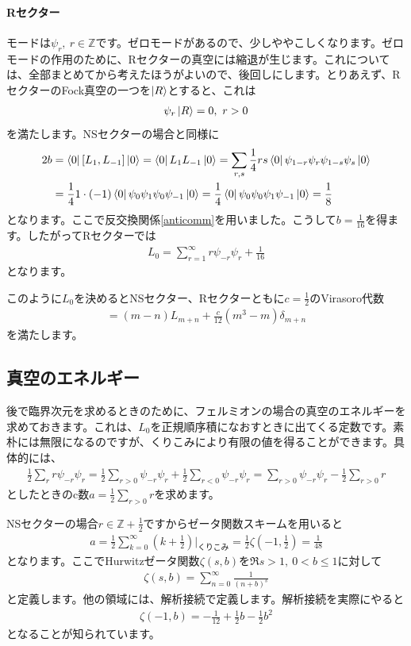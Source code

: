 \documentclass[report,paper=a4, fontsize=12pt, line_length=16cm, number_of_lines=33,dvipdfmx]{jlreq}
\numberwithin{equation}{chapter}
\numberwithin{equation}{section}
\newcommand{\Zb}{\mathbb{Z}}
\begin{document}
\paragraph{Rセクター}
モードは$\psi_{r},\ r\in \Zb$です。ゼロモードがあるので、少しややこしくなります。ゼロモードの作用のために、Rセクターの真空には縮退が生じます。これについては、全部まとめてから考えたほうがよいので、後回しにします。とりあえず、RセクターのFock真空の一つを$\ket{R}$とすると、これは
\begin{align}
  \psi_{r}\ket{R}=0,\ r>0
\end{align}
を満たします。NSセクターの場合と同様に
\begin{align}
  2b&=\bra{0}[L_{1},L_{-1}]\ket{0}
  =\bra{0}L_{1}L_{-1}\ket{0}
  =\sum_{r,s}\frac14rs\bra{0}\psi_{1-r}\psi_{r}\psi_{1-s}\psi_{s}\ket{0}\nonumber\\
  &
  =\frac14 1\cdot (-1)\bra{0}\psi_{0}\psi_{1}\psi_{0}\psi_{-1}\ket{0}
  =\frac14 \bra{0}\psi_{0}\psi_{0}\psi_{1}\psi_{-1}\ket{0}
  =\frac{1}{8}
\end{align}
となります。ここで反交換関係\eqref{anticomm}を用いました。こうして$b=\frac{1}{16}$を得ます。したがってRセクターでは
\begin{align}
  L_0=\sum_{r=1}^{\infty} r\psi_{-r}\psi_{r}
  +\frac{1}{16}
\end{align}
となります。

このように$L_0$を決めるとNSセクター、Rセクターともに$c=\frac12$のVirasoro代数
\begin{align}
  [L_m,L_n]=(m-n)L_{m+n}+\frac{c}{12}(m^3-m)\delta_{m+n}
\end{align}
を満たします。

\subsection{真空のエネルギー}
後で臨界次元を求めるときのために、フェルミオンの場合の真空のエネルギーを求めておきます。これは、$L_0$を正規順序積になおすときに出てくる定数です。素朴には無限になるのですが、くりこみにより有限の値を得ることができます。具体的には、
\begin{align}
  \frac12\sum_{r}r\psi_{-r}\psi_{r}
  =
  \frac 12 \sum_{r>0}\psi_{-r}\psi_{r}
  +  \frac 12 \sum_{r<0}\psi_{-r}\psi_{r}
  =\sum_{r>0}\psi_{-r}\psi_{r}-\frac12 \sum_{r>0}r
\end{align}
としたときのc数$a=\frac12 \sum_{r>0}r$を求めます。

NSセクターの場合$r\in \Zb+\frac12$ですからゼータ関数スキームを用いると
\begin{align}
 a=\frac12 \sum_{k=0}^{\infty}(k+\frac12)\Bigg|_{\text{くりこみ}}=\frac12 \zeta(-1,\frac12)=
 \frac{1}{48}\label{aNSfermion1}
\end{align}
となります。ここでHurwitzゼータ関数$\zeta(s,b)$を$\Re s >1,\ 0< b \le 1$に対して
\begin{align}
  \zeta(s,b)=\sum_{n=0}^{\infty}\frac{1}{(n+b)^s}
\end{align}
と定義します。他の領域には、解析接続で定義します。解析接続を実際にやると
\begin{align}
  \zeta(-1,b)=-\frac{1}{12}+\frac12 b -\frac12 b^2
\end{align}
となることが知られています。
\end{document}
